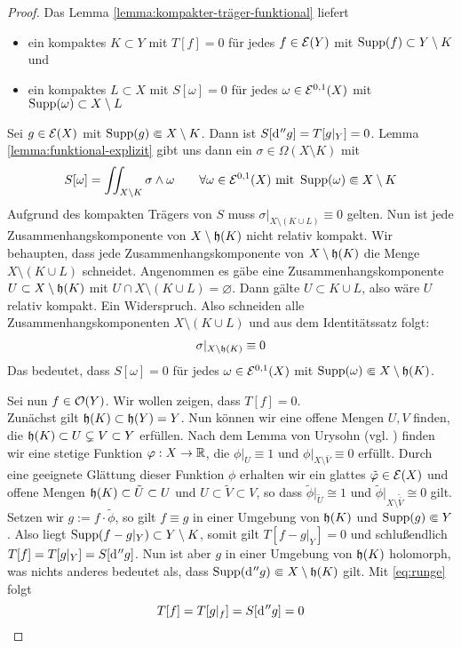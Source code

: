 \begin{proof}
  Das Lemma \ref{lemma:kompakter-träger-funktional} liefert
  \begin{itemize}
  \item ein kompaktes $K \subset Y$ mit $T[f] = 0$ für jedes $f \in
    \mathcal{E}(Y)$ mit $\operatorname{Supp}(f) \subset Y \setminus K$ und
  \item ein kompaktes $L \subset X$ mit $S[\omega] = 0$ für jedes
    $\omega \in \mathcal{E}^{0,1}(X)$ mit $\operatorname{Supp}(\omega) \subset X\setminus L$
  \end{itemize}
   Sei $g \in \mathcal{E}(X)$ mit $\operatorname{Supp}(g) \Subset X \setminus K$. Dann ist
   $S[\d[''g]] = T[g|_Y]  = 0$. Lemma \ref{lemma:funktional-explizit}
   gibt uns dann ein $\sigma \in \Omega(X\setminus K)$ mit
   \[
   S[\omega] = \iint_{X \setminus K}\sigma \wedge \omega \qquad
   \forall \omega \in \mathcal{E}^{0,1}(X) \text{ mit } \operatorname{Supp}(\omega)
   \Subset X\setminus K
   \]
   Aufgrund des kompakten Trägers von $S$ muss $\sigma|_{X \setminus
     (K \cup L)} \equiv 0$ gelten. 
   Nun ist jede Zusammenhangskomponente von $X \setminus \mathfrak{h}(K)$
   nicht relativ kompakt. 
   Wir behaupten, dass jede Zusammenhangskomponente von $X \setminus
   \mathfrak{h}(K)$ die Menge $X \setminus (K \cup L)$ schneidet.
   Angenommen es gäbe eine Zusammenhangskomponente $U \subset X
   \setminus \mathfrak{h}(K)$ mit $U \cap X \setminus ( K \cup L) =
   \varnothing$. Dann gälte $U \subset K \cup L$, also wäre $U$ relativ
   kompakt. Ein Widerspruch. Also schneiden alle
   Zusammenhangskomponenten $X \setminus (K \cup L)$ und aus dem
   Identitätssatz folgt:
   \begin{align}
   \sigma|_{X \setminus \mathfrak{h}(K)} \equiv 0 \label{eq:runge}
   \end{align}
   Das bedeutet, dass $S[\omega] = 0$ für jedes $\omega \in
   \mathcal{E}^{0,1}(X)$ mit $\operatorname{Supp}(\omega) \Subset X \setminus
   \mathfrak{h}(K)$.

   Sei nun $f \in \mathcal{O}(Y)$. Wir wollen zeigen, dass $T[f] = 0$. \\
   Zunächst gilt $\mathfrak{h}(K) \subset \mathfrak{h}(Y) = Y$. Nun können wir
   eine offene Mengen $U, V$ finden, die $ \mathfrak{h}(K) \subset U
   \subsetneq V \subset Y$ erfüllen. Nach dem Lemma von Urysohn
   (vgl. \cite[Satz 12.2]{Jam}) finden
   wir eine stetige Funktion $\varphi: X \rightarrow \mathbb{R}$, die $\phi|_U \equiv 1$
   und $\phi|_{X \setminus \bar V} \equiv 0$ erfüllt. Durch eine geeignete Glättung
   dieser Funktion $\phi$ erhalten wir ein glattes $\tilde {\varphi} \in
   \mathcal{E}(X)$ und offene Mengen $\mathfrak{h}(K) \subset \tilde U \subset U$
   und $U \subset \tilde V \subset V$, so dass $\tilde \phi|_{\tilde
     U} \cong 1$ und $\tilde \phi|_{X \setminus \tilde {\bar V}} \cong
   0$ gilt. Setzen wir $ g := f \cdot \tilde \phi$, so gilt
   $f \equiv g$ in einer Umgebung von $\mathfrak{h}(K)$ und $\operatorname{Supp}(g) \Subset Y$.
   Also liegt $\operatorname{Supp}(f - g|_Y) \subset Y \setminus K$, somit gilt $T[f- g|_Y] = 0$
   und schlußendlich $T[f] = T[g|_Y] = S[\d[''g]]$. 
   Nun ist aber $g$ in einer Umgebung von $\mathfrak{h}(K)$ holomorph, was
   nichts anderes bedeutet als, dass $\Supp(\d[''g]) \Subset X \setminus
   \runge(K)$ gilt.
   Mit \eqref{eq:runge} folgt
   \[
   T[f] = T[g|_f] = S[\d[''g]] = 0
   \]
\end{proof}

